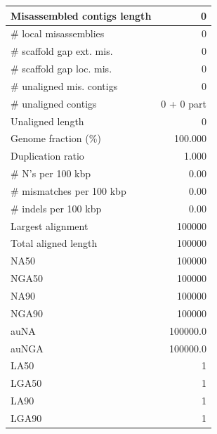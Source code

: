 \documentclass[12pt,a4paper]{article}
\begin{document}
\begin{table}[ht]
\begin{center}
\begin{tabular}{|l*{1}{|r}|}
Misassembled contigs length & 0 \\ \hline
\# local misassemblies & 0 \\ \hline
\# scaffold gap ext. mis. & 0 \\ \hline
\# scaffold gap loc. mis. & 0 \\ \hline
\# unaligned mis. contigs & 0 \\ \hline
\# unaligned contigs & 0 + 0 part \\ \hline
Unaligned length & 0 \\ \hline
Genome fraction (\%) & 100.000 \\ \hline
Duplication ratio & 1.000 \\ \hline
\# N's per 100 kbp & 0.00 \\ \hline
\# mismatches per 100 kbp & 0.00 \\ \hline
\# indels per 100 kbp & 0.00 \\ \hline
Largest alignment & 100000 \\ \hline
Total aligned length & 100000 \\ \hline
NA50 & 100000 \\ \hline
NGA50 & 100000 \\ \hline
NA90 & 100000 \\ \hline
NGA90 & 100000 \\ \hline
auNA & 100000.0 \\ \hline
auNGA & 100000.0 \\ \hline
LA50 & 1 \\ \hline
LGA50 & 1 \\ \hline
LA90 & 1 \\ \hline
LGA90 & 1 \\ \hline
\end{tabular}
\end{center}
\end{table}
\end{document}
